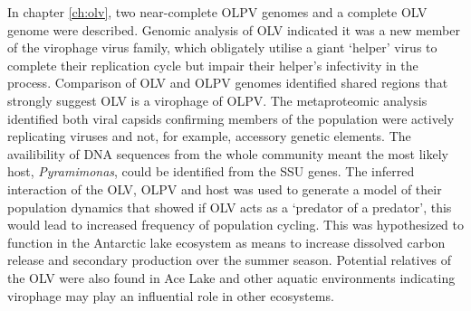 In chapter \ref{ch:olv}, two near-complete \ac{OLPV} genomes and a complete \ac{OLV} genome were described.
Genomic analysis of \ac{OLV} indicated it was a new member of the virophage virus family, which obligately utilise a  giant `helper' virus to complete their replication cycle but impair their helper's infectivity in the process.
Comparison of \ac{OLV} and \ac{OLPV} genomes identified shared regions that strongly suggest \ac{OLV} is a virophage of \ac{OLPV}.
The metaproteomic analysis identified both viral capsids confirming members of the population were actively replicating viruses and not, for example, accessory genetic elements.
The availibility of \textsc{DNA} sequences from the whole community meant the most likely host, \emph{Pyramimonas}, could be identified from the \ac{SSU} genes.
The inferred interaction of the \ac{OLV}, \ac{OLPV} and host was used to generate a model of their population dynamics that showed if \ac{OLV} acts as a `predator of a predator', this would lead to increased frequency of population cycling.
This was hypothesized to function in the Antarctic lake ecosystem as means to increase dissolved carbon release and secondary production over the summer season.
Potential relatives of the \ac{OLV} were also found in Ace Lake and other aquatic environments indicating virophage may play an influential role in other ecosystems.

